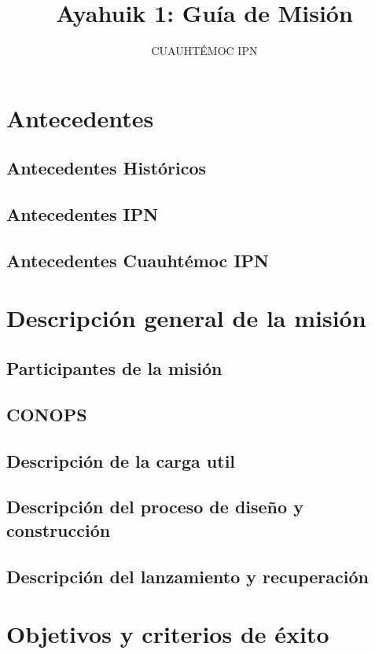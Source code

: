 \documentclass[letterpaper,12pt]{article} %
\title{Ayahuik 1: Guía de Misión}
\author{CUAUHTÉMOC IPN}
\begin{document}
\tableofcontents

\section{Antecedentes}

    \subsection{Antecedentes Históricos}

    \subsection{Antecedentes IPN}

    \subsection{Antecedentes Cuauhtémoc IPN}

\section{Descripción general de la misión}

    \subsection{Participantes de la misión}

    \subsection{CONOPS}

    \subsection{Descripción de la carga util}

    \subsection{Descripción del proceso de diseño y construcción}

    \subsection{Descripción del lanzamiento y recuperación}

\section{Objetivos y criterios de éxito}
\end{document}
